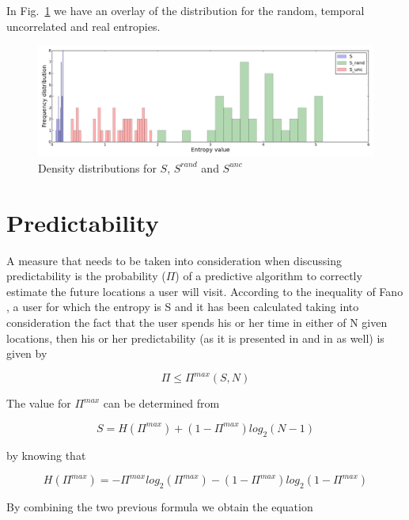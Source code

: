 In Fig.~\ref{dis_overlay} we have an overlay of the distribution for the random,
temporal uncorrelated and real entropies.

\begin{figure}[!h]
\centering
\includegraphics[width=\textwidth]{figures/entro_pred/overlay.png}
\caption{Density distributions for $S$, $S^{rand}$ and $S^{unc}$}
\label{dis_overlay}
\end{figure}

\section{Predictability}

A measure that needs to be taken into consideration when discussing
predictability is the probability ($\Pi$) of a predictive algorithm to correctly
estimate the future locations a user will visit. According to the inequality of
Fano \cite{brabazon2008natural} \cite{1057678}, a user for which the entropy is
S and it has been calculated taking into consideration the fact that the user
spends his or her time in either of N given locations, then his or her
predictability (as it is presented in \cite{Barabasi10} and in \cite{Sinatra14}
as well) is given by

\begin{equation}
\label{ineq_pred}
\Pi \leq \Pi^{max}(S,N)
\end{equation}

The value for $\Pi^{max}$ can be determined from

\begin{equation}
\label{pred}
S = H(\Pi^{max}) + (1 - \Pi^{max})log_{2}(N-1)  
\end{equation}

by knowing that

\begin{equation}
\label{h_func}
H(\Pi^{max}) = - \Pi^{max}log_{2}(\Pi^{max}) - (1-\Pi^{max})log_{2}(1-\Pi^{max})   
\end{equation}  

By combining the two previous formula we obtain the equation

